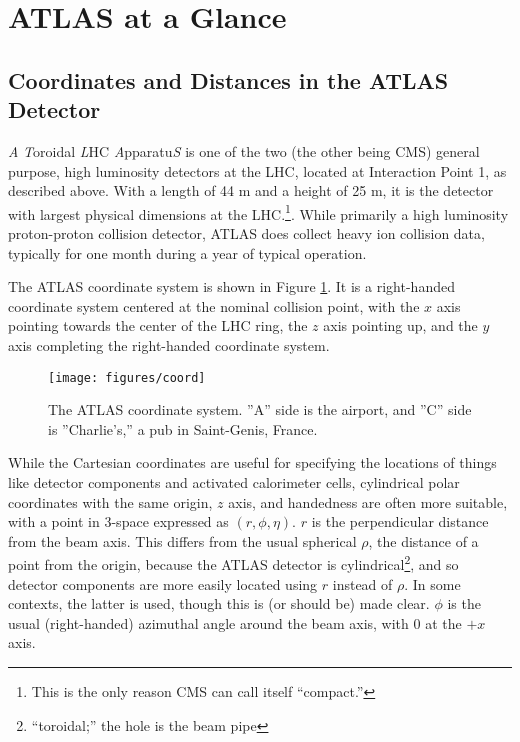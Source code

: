\section{ATLAS at a Glance}
\subsection{Coordinates and Distances in the ATLAS Detector}
\emph{A} \emph{T}oroidal \emph{L}HC \emph{A}pparatu\emph{S} is one of the two (the other being CMS) general purpose, high luminosity detectors at the LHC, located at Interaction Point 1, as described above.  With a length of 44 m and a height of 25 m, it is the detector with largest physical dimensions at the LHC.\footnote{This is the only reason CMS can call itself ``compact.''}.  While primarily a high luminosity proton-proton collision detector, ATLAS does collect heavy ion collision data, typically for one month during a year of typical operation.  

The ATLAS coordinate system is shown in Figure \ref{fig:acoord}.  It is a right-handed coordinate system centered at the nominal collision point, with the $x$ axis pointing towards the center of the LHC ring, the $z$ axis pointing up, and the $y$ axis completing the right-handed coordinate system.

\begin{figure}[!htbp]\captionsetup{justification=centering}
  \centering
  \texttt{[image: figures/coord]}
  \caption{The  ATLAS coordinate system.  ''A'' side is the airport, and ''C'' side is ''Charlie's,'' a pub in Saint-Genis, France.}
  \label{fig:acoord}
\end{figure}

While the Cartesian coordinates are useful for specifying the locations of things like detector components and activated calorimeter cells, cylindrical polar coordinates with the same origin, $z$ axis, and handedness are often more suitable, with a point in 3-space expressed as $\left(r,\phi,\eta\right)$.  $r$ is the perpendicular distance from the beam axis.  This differs from the usual spherical $\rho$, the distance of a point from the origin, because the ATLAS detector is cylindrical\footnote{``toroidal;'' the hole is the beam pipe}, and so detector components are more easily located using $r$ instead of $\rho$.  In some contexts, the latter is used, though this is (or should be) made clear.  $\phi$ is the usual (right-handed) azimuthal angle around the beam axis, with 0 at the $+x$ axis.

